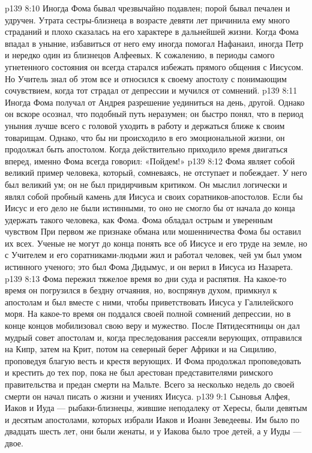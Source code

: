 \vs p139 8:10 \pc Иногда Фома бывал чрезвычайно подавлен; порой бывал печален и удручен. Утрата сестры\hyp{}близнеца в возрасте девяти лет причинила ему много страданий и плохо сказалась на его характере в дальнейшей жизни. Когда Фома впадал в уныние, избавиться от него ему иногда помогал Нафанаил, иногда Петр и нередко один из близнецов Алфеевых. К сожалению, в периоды самого угнетенного состояния он всегда старался избежать прямого общения с Иисусом. Но Учитель знал об этом все и относился к своему апостолу с понимающим сочувствием, когда тот страдал от депрессии и мучился от сомнений.
\vs p139 8:11 Иногда Фома получал от Андрея разрешение уединиться на день, другой. Однако он вскоре осознал, что подобный путь неразумен; он быстро понял, что в период уныния лучше всего с головой уходить в работу и держаться ближе к своим товарищам. Однако, что бы ни происходило в его эмоциональной жизни, он продолжал быть апостолом. Когда действительно приходило время двигаться вперед, именно Фома всегда говорил: «Пойдем!»
\vs p139 8:12 Фома являет собой великий пример человека, который, сомневаясь, не отступает и побеждает. У него был великий ум; он не был придирчивым критиком. Он мыслил логически и являл собой пробный камень для Иисуса и своих соратников\hyp{}апостолов. Если бы Иисус и его дело не были истинными, то оно не смогло бы от начала до конца удержать такого человека, как Фома. Фома обладал острым и уверенным чувством  При первом же признаке обмана или мошенничества Фома бы оставил их всех. Ученые не могут до конца понять все об Иисусе и его труде на земле, но с Учителем и его соратниками\hyp{}людьми жил и работал человек, чей ум был умом истинного ученого; это был Фома Дидымус, и он верил в Иисуса из Назарета.
\vs p139 8:13 \pc Фома пережил тяжелое время во дни суда и распятия. На какое\hyp{}то время он погрузился в бездну отчаяния, но, воспрянув духом, примкнул к апостолам и был вместе с ними, чтобы приветствовать Иисуса у Галилейского моря. На какое\hyp{}то время он поддался своей полной сомнений депрессии, но в конце концов мобилизовал свою веру и мужество. После Пятидесятницы он дал мудрый совет апостолам и, когда преследования рассеяли верующих, отправился на Кипр, затем на Крит, потом на северный берег Африки и на Сицилию, проповедуя благую весть и крестя верующих. И Фома продолжал проповедовать и крестить до тех пор, пока не был арестован представителями римского правительства и предан смерти на Мальте. Всего за несколько недель до своей смерти он начал писать о жизни и учениях Иисуса.
\vs p139 9:1 Сыновья Алфея, Иаков и Иуда --- рыбаки\hyp{}близнецы, жившие неподалеку от Хересы, были девятым и десятым апостолами, которых избрали Иаков и Иоанн Зеведеевы. Им было по двадцать шесть лет, они были женаты, и у Иакова было трое детей, а у Иуды --- двое.
